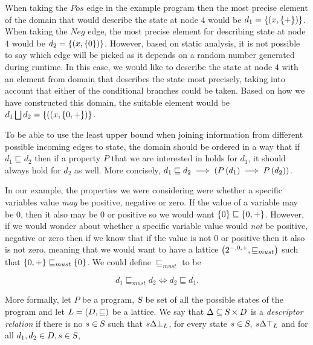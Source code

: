 \documentclass[..thesis.tex]{subfiles}
\begin{document}
When taking the $Pos$ edge in the example program then the most precise element of the domain that would describe the state at node $4$ would be $d_1 = \left\lbrace \left( x, \left\lbrace + \right\rbrace \right) \right\rbrace$. When taking the $Neg$ edge, the most precise element for describing state at node $4$ would be $ d_2 = \left\lbrace \left( x, \left\lbrace 0 \right\rbrace \right) \right\rbrace$. However, based on static analysis, it is not possible to say which edge will be picked as it depends on a random number generated during runtime. In this case, we would like to describe the state at node $4$ with an element from domain that describes the state most precisely, taking into account that either of the conditional branches could be taken. Based on how we have constructed this domain, the suitable element would be $d_1 \bigsqcup d_2 = \left\lbrace \left( (x, \left\lbrace 0, + \right\rbrace \right) \right\rbrace$.

To be able to use the least upper bound when joining information from different possible incoming edges to state, the domain should be ordered in a way that if $d_1 \sqsubseteq d_2$ then if a property $P$ that we are interested in holds for $d_1$, it should always hold for $d_2$ as well. More concisely, $d_1 \sqsubseteq d_2 \implies\left(  P \left( d_1 \right) \implies P \left( d_2 \right) \right)$.

In our example, the properties we were considering were whether a specific variables value \textit{may} be positive, negative or zero. If the value of a variable may be $0$, then it also may be $0$ or positive so we would want $\left\lbrace 0 \right\rbrace \sqsubseteq \left\lbrace 0, + \right\rbrace$. However, if we would wonder about whether a specific variable value would \textit{not} be positive, negative or zero then if we know that if the value is not 0 or positive then it also is not zero, meaning that we would want to have a lattice $\left( 2^{-,0,+}, \sqsubseteq_{must} \right)$ such that $\left\lbrace 0 , + \right\rbrace \sqsubseteq_{must} \left\lbrace 0 \right\rbrace$. We could define $\sqsubseteq_{must}$ to be

\begin{equation*}
d_1 \sqsubseteq_{must} d_2 \iff d_2 \sqsubseteq d_1 \text{.} 
\end{equation*} 



More formally, let $P$ be a program, $\textsl{S}$ be set of all the possible states of the program and let $L = \left( D, \sqsubseteq \right)$ be a lattice. We say that $\Delta \subseteq \textsl{S} \times D$ is a \textit{descriptor relation} if there is no $s \in \textsl{S}$ such that $s \Delta \bot_L$, for every state $s \in \textsl{S}$, $s \Delta \top_L$ and for all $d_1,d_2 \in D, s \in \textsl{S}$,
\end{document}
